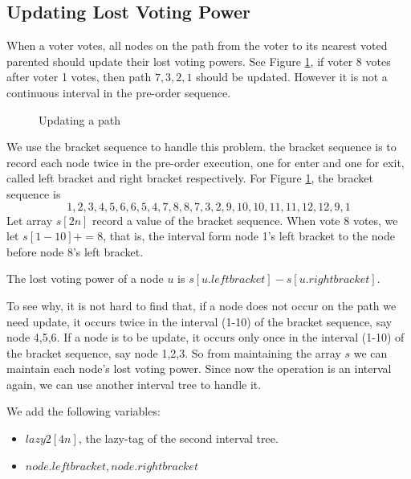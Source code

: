 \subsection{Updating Lost Voting Power}
When a voter votes, all nodes on the path from the voter to its nearest voted parented should update their lost voting powers. See Figure \ref{fig:2}, if voter 8 votes after voter 1 votes, then path $7,3,2,1$ should be updated. However it is not a continuous interval in the pre-order sequence.
\begin{figure}
  \centering
	\label{fig:2}
  
	\caption{Updating a path}
\end{figure}
We use the bracket sequence to handle this problem. the bracket sequence is to record each node twice in the pre-order execution, one for enter and one for exit, called left bracket and right bracket respectively. For Figure \ref{fig:2}, the bracket sequence is
$$1,2,3,4,5,6,6,5,4,7,8,8,7,3,2,9,10,10,11,11,12,12,9,1$$
Let array $s[2n]$ record a value of the bracket sequence. When vote 8 votes, we let $s[1-10]+=8$, that is, the interval form node 1's left bracket to the node before node 8's left bracket.

The lost voting power of a node $u$ is $s[u.leftbracket]-s[u.rightbracket]$.

To see why, it is not hard to find that, if a node does not occur on the path we need update, it occurs twice in the interval (1-10) of the bracket sequence, say node 4,5,6. If a node is to be update, it occurs only once in the interval  (1-10) of the bracket sequence, say node 1,2,3. So from maintaining the array $s$ we can maintain each node's lost voting power. Since now the operation is an interval again, we can use another interval tree to handle it.

We add the following variables:
\begin{itemize}
\item $lazy2[4n]$, the lazy-tag of the second interval tree.
\item $node.leftbracket,node.rightbracket$
\end{itemize}

